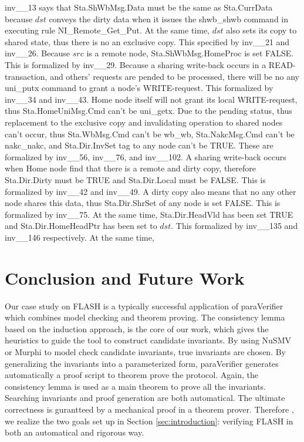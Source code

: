 \documentclass{llncs}
\begin{document}
inv\_\_13 says that Sta.ShWbMsg.Data must be the same as Sta.CurrData because $dst$ conveys the dirty data when it issues the  shwb\_shwb command in executing rule NI\_Remote\_Get\_Put. At the same time, $dst$ also sets its copy to shared state, thus there is no an exclusive copy. This specified by inv\_\_21 and inv\_\_26. Because   $src$ is a remote node, Sta.ShWbMsg.HomeProc is set FALSE. This is formalized by inv\_\_29. Because  a sharing write-back occurs in a READ-transaction, and others' requests are pended to be processed, there will be no any uni\_putx command  to grant a node's WRITE-request. This formalized by inv\_\_34 and inv\_\_43. Home node itself will not grant its local WRITE-request, thus Sta.HomeUniMsg.Cmd  can't be  uni\_getx. Due to the pending status, thus replacement to the exclusive copy and invalidating operation to shared nodes can't occur, thus Sta.WbMsg.Cmd can't be wb\_wb, Sta.NakcMsg.Cmd can't be nakc\_nakc, and Sta.Dir.InvSet tag to any node can't be TRUE. These are formalized by inv\_\_56, inv\_\_76, and inv\_\_102.  A sharing write-back occurs when Home node find that there is a remote and dirty copy, therefore Sta.Dir.Dirty must be TRUE and Sta.Dir.Local must be FALSE. This is formalized by inv\_\_42 and inv\_\_49. A dirty copy also means that no any other node shares this data, thus Sta.Dir.ShrSet of any node is set FALSE. This is formalized by inv\_\_75.  At the same time, Sta.Dir.HeadVld has been set TRUE and Sta.Dir.HomeHeadPtr has been set to $dst$. This formalized by inv\_\_135 and inv\_\_146 respectively. At the same time,


\section{Conclusion and Future Work\label{sec:conclusion}}
Our case study on FLASH is a  typically successful application of {\sf paraVerifier} which combines model checking and theorem proving. The
consistency lemma based on the induction approach, is the
core of our work, which gives the heuristics to guide the tool
 to construct candidate invariants. By using NuSMV or Murphi to model check  candidate invariants, true invariants are  chosen.  By generalizing the invariants into a parameterized form, {\sf paraVerifier} generates automatically a proof script to  theorem prove the protocol. Again, the consistency lemma is used as a main theorem to prove all the invariants. Searching invariants and proof generation are both automatical. The ultimate correctness is gurantteed by a mechanical proof in a theorem prover. Therefore , we realize the two goals set up in Section \ref{sec:introduction}: verifying FLASH in both an automatical and rigorous way.
\end{document}
